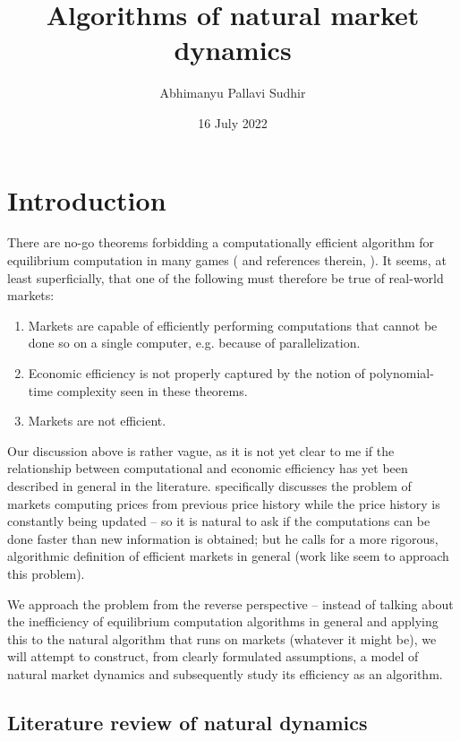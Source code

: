 \documentclass{article}
\title{Algorithms of natural market dynamics}
\author{Abhimanyu Pallavi Sudhir}
\date{16 July 2022}
\begin{document}
\maketitle

\section{Introduction}
\label{sec:intro}

There are no-go theorems forbidding a computationally efficient algorithm for equilibrium computation in many games (\cite{agt:2} and references therein, \cite{maymin}). It seems, at least superficially, that one of the following must therefore be true of real-world markets:

\begin{enumerate}
    \item Markets are capable of efficiently performing computations that cannot be done so on a single computer, e.g. because of parallelization.
    \item Economic efficiency is not properly captured by the notion of polynomial-time complexity seen in these theorems.
    \item Markets are not efficient.
\end{enumerate}

Our discussion above is rather vague, as it is not yet clear to me if the relationship between computational and economic efficiency has yet been described in general in the literature. \cite{maymin} specifically discusses the problem of markets computing prices from previous price history while the price history is constantly being updated -- so it is natural to ask if the computations can be done faster than new information is obtained; but he calls for a more rigorous, algorithmic definition of efficient markets in general (work like \cite{chenthesis, norman} seem to approach this problem).

We approach the problem from the reverse perspective -- instead of talking about the inefficiency of equilibrium computation algorithms in general and applying this to the natural algorithm that runs on markets (whatever it might be), we will attempt to construct, from clearly formulated assumptions, a model of natural market dynamics and subsequently study its efficiency as an algorithm.

\subsection{Literature review of natural dynamics}
\end{document}
